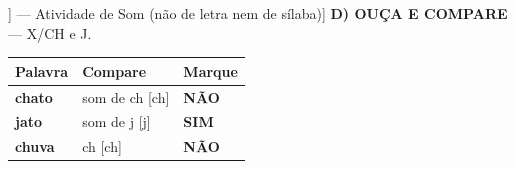 \begin{exercicio}[Som /ch/ (x) [[S]] --- Atividade de Som (não de letra nem de sílaba)]
\textbf{D) OUÇA E COMPARE} --- X/CH e J.

\begin{center}
\begin{tabular}{@{}p{4.2cm}p{6.2cm}p{1.6cm}@{}}
\hline
\textbf{Palavra} & \textbf{Compare} & \textbf{Marque} \\
\hline
\textbf{chato} & som de ch [ch] & \textbf{NÃO} \\
\textbf{jato} & som de j [j] & \textbf{SIM} \\
\textbf{chuva} & ch [ch] & \textbf{NÃO} \\
\hline
\end{tabular}
\end{center}

\end{exercicio}

